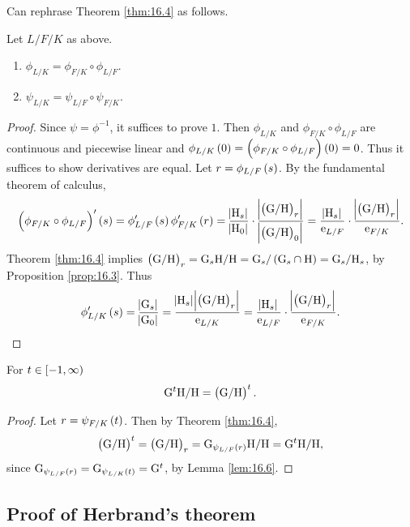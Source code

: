 Can rephrase Theorem \ref{thm:16.4} as follows.

\begin{lemma}
\label{lem:16.6}
Let $ L / F / K $ as above.
\begin{enumerate}
\item $ \phi_{L / K} = \phi_{F / K} \circ \phi_{L / F} $.
\item $ \psi_{L / K} = \psi_{L / F} \circ \psi_{F / K} $.
\end{enumerate}
\end{lemma}

\begin{proof}
Since $ \psi = \phi^{-1} $, it suffices to prove $ 1 $. Then $ \phi_{L / K} $ and $ \phi_{F / K} \circ \phi_{L / F} $ are continuous and piecewise linear and $ \phi_{L / K}\br{0} = \br{\phi_{F / K} \circ \phi_{L / F}}\br{0} = 0 $. Thus it suffices to show derivatives are equal. Let $ r = \phi_{L / F}\br{s} $. By the fundamental theorem of calculus,
$$ \br{\phi_{F / K} \circ \phi_{L / F}}'\br{s} = \phi_{L / F}'\br{s}\phi_{F / K}'\br{r} = \dfrac{\abs{\H_s}}{\abs{\H_0}} \cdot \dfrac{\abs{\br{\G / \H}_r}}{\abs{\br{\G / \H}_0}} = \dfrac{\abs{\H_s}}{\e_{L / F}} \cdot \dfrac{\abs{\br{\G / \H}_r}}{\e_{F / K}}. $$
Theorem \ref{thm:16.4} implies $ \br{\G / \H}_r = \G_s\H / \H = \G_s / \br{\G_s \cap \H} = \G_s / \H_s $, by Proposition \ref{prop:16.3}. Thus
$$ \phi_{L / K}'\br{s} = \dfrac{\abs{\G_s}}{\abs{\G_0}} = \dfrac{\abs{\H_s}\abs{\br{\G / \H}_r}}{\e_{L / K}} = \dfrac{\abs{\H_s}}{\e_{L / F}} \cdot \dfrac{\abs{\br{\G / \H}_r}}{\e_{F / K}}. $$
\end{proof}

\begin{corollary}
\label{cor:16.7}
For $ t \in \intco{-1, \infty} $
$$ \G^t\H / \H = \br{\G / \H}^t. $$
\end{corollary}

\begin{proof}
Let $ r = \psi_{F / K}\br{t} $. Then by Theorem \ref{thm:16.4},
$$ \br{\G / \H}^t = \br{\G / \H}_r = \G_{\psi_{L / F}\br{r}}\H / \H = \G^t\H / \H, $$
since $ \G_{\psi_{L / F}\br{r}} = \G_{\psi_{L / K}\br{t}} = \G^t $, by Lemma \ref{lem:16.6}.
\end{proof}

\subsection{Proof of Herbrand's theorem}


